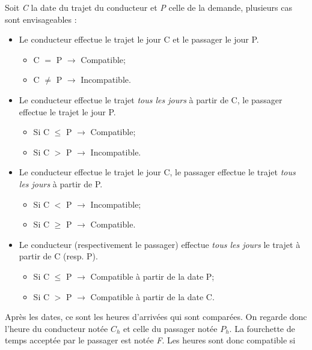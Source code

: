 \documentclass[12pt, a4paper, oneside]{article}
\begin{document}
{{     Soit \textit{C} la date du trajet du conducteur et \textit{P} celle de la demande, plusieurs cas sont envisageables :\\
    \begin{itemize}
        \item Le conducteur effectue le trajet le jour C et le passager le jour P.
        \begin{itemize}
            \item C $=$ P $\rightarrow$ Compatible;
            \item C $\neq$ P $\rightarrow$ Incompatible.
        \end{itemize}
        \item Le conducteur effectue le trajet \textit{tous les jours} à partir de C, le passager effectue le trajet le jour P. 
        \begin{itemize}
            \item Si C $\leq$ P $\rightarrow$ Compatible;
            \item Si C $>$ P $\rightarrow$ Incompatible.
        \end{itemize}
        \item Le conducteur effectue le trajet le jour C, le passager effectue le trajet \textit{tous les jours} à partir de P.
        \begin{itemize}
            \item Si C $<$ P $\rightarrow$ Incompatible; 
            \item Si C $\geq$ P $\rightarrow$ Compatible.
        \end{itemize}
        \item Le conducteur (respectivement le passager) effectue \textit{tous les jours} le trajet à partir de C (resp. P).
        \begin{itemize}
            \item Si C $\leq$ P $\rightarrow$ Compatible à partir de la date P;
            \item Si C $>$ P $\rightarrow$ Compatible à partir de la date C.\\
        \end{itemize}
    \end{itemize}
    Après les dates, ce sont les heures d'arrivées qui sont comparées. On regarde donc l'heure du conducteur notée \textit{$C_{h}$} et celle du passager notée \textit{$P_{h}$}. La fourchette de temps acceptée par le passager est notée \textit{F}. Les heures sont donc compatible si 
    \begin{equation*}

\end{equation*}}}
\end{document}
